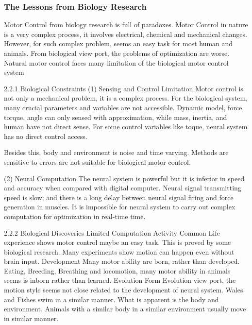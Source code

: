 \subsubsection{The Lessons from Biology Research}
Motor Control from biology research is full of paradoxes.
Motor Control in nature is a very complex process, it involves electrical, chemical and mechanical changes. However, for such complex problem, seems an easy task for most human and animals.
From biological view port, the problems of optimization are worse. Natural motor control faces many limitation of the biological motor control system

2.2.1 Biological Constraints
(1) Sensing and Control Limitation
Motor control is not only a mechanical problem, it is a complex process. 
For the biological system,  many crucial parameters and variables are not accessible. 
Dynamic model, force, torque, angle can only sensed with approximation, while mass, inertia, and human have not direct sense. 
For some control variables like toque, neural system has no direct control access.

Besides this, body and environment is noise and time varying.
Methods are sensitive to errors are not suitable for biological motor control.

(2) Neural Computation
The neural system is powerful but it is inferior in speed and accuracy when compared with digital computer. 
Neural signal transmitting speed is slow; and there is a long delay between neural signal firing and force generation in muscles. 
It is impossible for neural system to carry out complex computation for optimization in real-time time.

2.2.2 Biological Discoveries
Limited Computation Activity
Common Life experience shows motor control maybe an easy task. 
This is proved by some biological research. Many experiments show motion can happen even without brain input.
Development
Many motor ability are born, rather than developed. 
Eating, Breeding, Breathing and locomotion, many motor ability in animals seems is inborn rather than learned. 
Evolution
Form Evolution view port, the motion style seems not close related to the development of neural system. 
Wales and Fishes swim in a similar manner.
What is apparent is the body and environment. Animals with a similar body in a similar environment usually move in similar manner.


